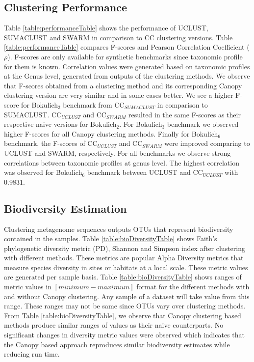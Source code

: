 \documentclass[10pt, conference, compsocconf]{IEEEtran}
\begin{document}
\subsection{\textbf{Clustering Performance}}
Table \ref{table:performanceTable} shows the performance of  UCLUST, SUMACLUST and SWARM  in comparison to CC clustering versions. Table 
\ref{table:performanceTable} compares F-scores and Pearson Correlation Coefficient ($\rho$). F-scores 
are only available for synthetic 
benchmarks since taxonomic profile for them is known. Correlation values were generated 
based on taxonomic profiles at the 
Genus level, 
generated from outputs of the  clustering methods. We observe 
that F-scores obtained from a clustering method and its corresponding Canopy clustering version are very similar and in some 
cases better. We see a higher F-score for Bokulich$_2$ benchmark from CC$_{SUMACLUST}$ in comparison to SUMACLUST.  CC$_{UCLUST}$ and CC$_{SWARM}$ resulted in the 
same F-scores as their respective naive versions for Bokulich$_2$. For Bokulich$_3$ benchmark we observed higher F-scores for all Canopy 
clustering methods. Finally for Bokulich$_6$ benchmark, the 
F-scores of CC$_{UCLUST}$ and CC$_{SWARM}$ were improved comparing to UCLUST and SWARM, respectively.
%
For all benchmarks we observe strong correlations between taxonomic profiles at genus level. The highest correlation was observed for 
Bokulich$_6$ benchmark between UCLUST and CC$_{UCLUST}$ with 0.9831. 


\subsection{\textbf{Biodiversity Estimation}} Clustering metagenome sequences outputs OTUs that represent biodiversity contained in the samples. Table 
\ref{table:bioDiversityTable} shows Faith’s phylogenetic diversity metric (PD), Shannon and Simpson index after clustering
with different methods. These metrics are 
popular Alpha Diversity metrics that measure species diversity in sites or habitats at 
a local scale. These metric values are generated per sample basis. Table \ref{table:bioDiversityTable} shows ranges of metric values
in $[minimum-maximum]$ format  for the different 
methods with and without Canopy clustering. Any sample of a dataset will take value from this range. These ranges may not be same since OTUs vary over clustering methods. From Table  \ref{table:bioDiversityTable}, we observe 
that Canopy clustering based methods produce similar ranges of values as their naive counterparts. No significant changes in diversity metric values 
were observed which indicates that the 
Canopy based approach reproduces similar biodiversity estimates while reducing run time.
\end{document}
